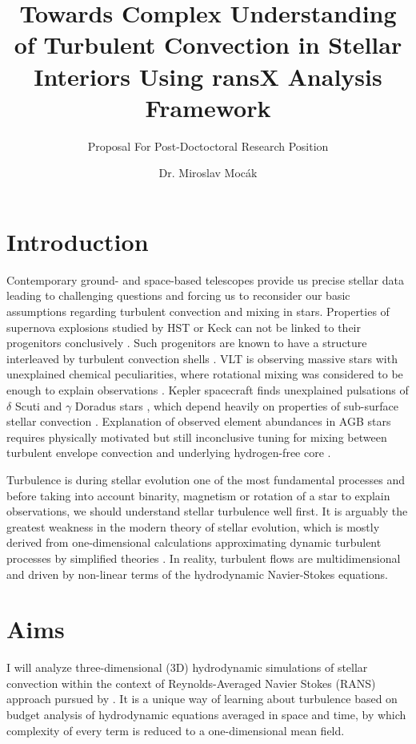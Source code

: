 \documentclass[11pt,paper=a4]{article}
\title{Towards Complex Understanding of Turbulent Convection in Stellar Interiors Using ransX Analysis Framework}
\subtitle{Proposal For Post-Doctoctoral Research Position}
\author{Dr. Miroslav Moc\'ak}
\begin{document}
\maketitle


\section{Introduction}

Contemporary ground- and space-based telescopes provide us precise stellar data leading to challenging questions and forcing us to reconsider our basic assumptions regarding turbulent convection and mixing in stars. Properties of supernova explosions studied by HST or Keck can not be linked to their progenitors conclusively \citep{Smartt2009}. Such progenitors are known to have a structure interleaved by turbulent convection shells \citep{HirschiMeynet2004}. VLT is observing massive stars with unexplained chemical peculiarities, where rotational mixing was considered to be enough to explain observations \citep{Evans2008}. Kepler spacecraft finds unexplained pulsations of $\delta$ Scuti and $\gamma$ Doradus stars \citep{UytterhoevenArxiv2011}, which depend heavily on properties of sub-surface stellar convection \citep{GuzikKaye2000}. Explanation of observed element abundances in AGB stars requires physically motivated but still inconclusive tuning for mixing between turbulent envelope convection and underlying hydrogen-free core \citep{Herwig2005}.

Turbulence is during stellar evolution one of the most fundamental processes and before taking into account binarity, magnetism or rotation of a star to explain observations, we should understand stellar turbulence well first. It is arguably the greatest weakness in the modern theory of stellar evolution, which is mostly derived from one-dimensional calculations approximating dynamic turbulent processes by simplified theories \citep{KipWeigert1990,CoxGiuli2008}. In reality, turbulent flows are multidimensional and driven by non-linear terms of the hydrodynamic Navier-Stokes equations. 

\section{Aims}

I will analyze three-dimensional (3D) hydrodynamic simulations of stellar convection within the context of Reynolds-Averaged Navier Stokes (RANS) approach pursued by \citet{Besnard1992,Livescu2009,Schwarzkopf2011}. It is a unique way of learning about turbulence based on budget analysis of hydrodynamic equations averaged in space and time, by which complexity of every term is reduced to a one-dimensional mean field.
\end{document}
